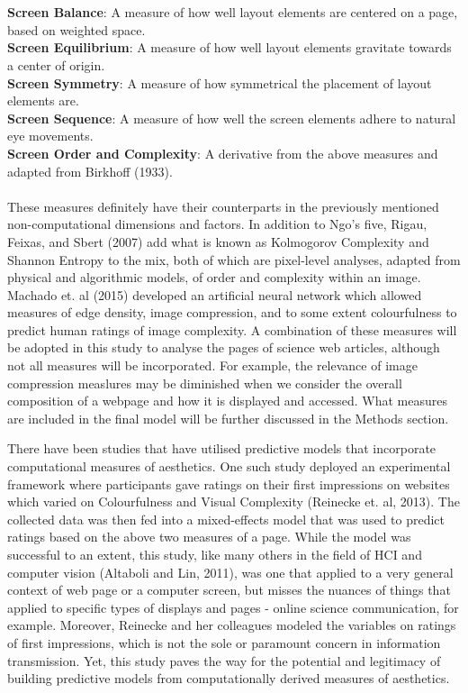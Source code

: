 \documentclass[letterpaper,12pt]{article}
\theoremstyle{definition}
\begin{document}
\\
\\
\textbf{Screen Balance}: A measure of how well layout elements are centered on a page, based on weighted space.
\\
\textbf{Screen Equilibrium}: A measure of how well layout elements gravitate towards a center of origin.
\\
\textbf{Screen Symmetry}: A measure of how symmetrical the placement of layout elements are.
\\
\textbf{Screen Sequence}: A measure of how well the screen elements adhere to natural eye movements.
\\
\textbf{Screen Order and Complexity}: A derivative from the above measures and adapted from Birkhoff (1933).
\\
\\
These measures definitely have their counterparts in the previously mentioned non-computational dimensions and factors. In addition to Ngo's five, Rigau, Feixas, and Sbert (2007) add what is known as Kolmogorov Complexity and Shannon Entropy to the mix, both of which are pixel-level analyses, adapted from physical and algorithmic models, of order and complexity within an image. Machado et. al (2015) developed an artificial neural network which allowed measures of edge density, image compression, and to some extent colourfulness to predict human ratings of image complexity. A combination of these measures will be adopted in this study to analyse the pages of science web articles, although not all measures will be incorporated. For example, the relevance of image compression measlures may be diminished when we consider the overall composition of a webpage and how it is displayed and accessed. What measures are included in the final model will be further discussed in the Methods section.

There have been studies that have utilised predictive models that incorporate computational measures of aesthetics. One such study deployed an experimental framework where participants gave ratings on their first impressions on websites which varied on Colourfulness and Visual Complexity (Reinecke et. al, 2013). The collected data was then fed into a mixed-effects model that was used to predict ratings based on the above two measures of a page. While the model was successful to an extent, this study, like many others in the field of HCI and computer vision (Altaboli and Lin, 2011), was one that applied to a very general context of web page or a computer screen, but misses the nuances of things that applied to specific types of displays and pages - online science communication, for example. Moreover, Reinecke and her colleagues modeled the variables on ratings of first impressions, which is not the sole or paramount concern in information transmission. Yet, this study paves the way for the potential and legitimacy of building predictive models from computationally derived measures of aesthetics. 
\end{document}
